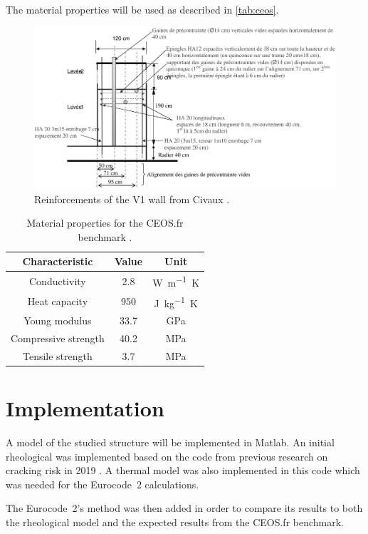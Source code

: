 \documentclass[a4paper,11pt]{memoir}
\begin{document}
The material properties will be used as described in \autoref{tab:ceos}.

\begin{figure}
  \centering
  \includegraphics[width=\linewidth]{ceos}
  \caption{Reinforcements of the V1 wall from Civaux \cite{ceos}.}\label{ceos}
\end{figure}

\begin{table}
  \centering
  \begin{tabular}{ccc}
    \toprule
    \bfseries Characteristic & \bfseries Value & \bfseries Unit \\
    \midrule
    Conductivity & \num{2.8} & \si{\watt\per\m\kelvin} \\
    Heat capacity & \num{950} & \si{\joule\per\kg\kelvin} \\
    Young modulus & \num{33.7} & \si{\giga\Pa} \\
    Compressive strength & \num{40.2} & \si\MPa \\
    Tensile strength & \num{3.7} & \si\MPa \\
    \bottomrule
  \end{tabular}
  \caption{Material properties for the CEOS.fr benchmark
  \cite{ceos}.}\label{tab:ceos}
\end{table}

\section{Implementation}
A model of the studied structure will be implemented in Matlab. An initial
rheological was implemented based on the code from previous research on
cracking risk in 2019 \cite{phd}. A thermal model was also implemented in this
code which was needed for the Eurocode~2 calculations.

The Eurocode~2's method was then added in order to compare its results to both
the rheological model and the expected results from the CEOS.fr benchmark.

\backmatter
\printbibliography
\end{document}
